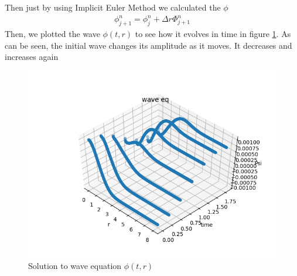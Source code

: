 \documentclass[aps,twocolumn,showpacs,preprintnumbers,nofootinbib,prl,superscriptaddress,groupedaddress]{revtex4-1}
\begin{document}
Then just by using Implicit Euler Method we calculated the $\phi$
\begin{align}
	\phi_{j+1}^n = \phi_{j}^n  + \Delta r\Phi^n_{j+1}
\end{align}
Then, we plotted the wave $ \phi(t,r) $ to see how it evolves in time in figure \ref{fig:waveequation}. As can be seen, the initial wave changes its amplitude as it moves. It decreases and increases again
\begin{figure}
	\centering
	\includegraphics[width=1\linewidth]{Figures/Beyond_Einstein_Figures/wave_equation}
	\caption{Solution to wave equation $ \phi(t,r) $ }
	\label{fig:waveequation}
\end{figure}
\end{document}
